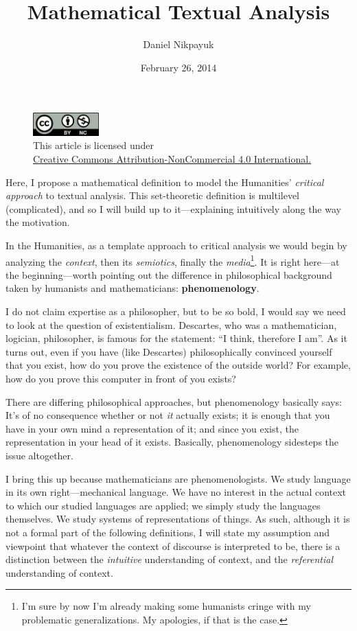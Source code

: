 \documentclass[twoside]{article}
\title{Mathematical Textual Analysis}
\author{Daniel Nikpayuk}
\date{February 26, 2014}
\begin{document}
\maketitle

\begin{figure}[h]
\centering
\includegraphics[width=1in]{cc-by-nc.png}\\[0.1in]
\tiny This article is licensed under \\
\href{http://creativecommons.org/licenses/by-nc/4.0/}
{Creative Commons Attribution-NonCommercial 4.0 International.}\\[0.3in]
\end{figure}

Here, I propose a mathematical definition to model the Humanities' \emph{critical approach} to textual analysis.
This set-theoretic definition is multilevel (complicated), and so I will build up to it---explaining intuitively
along the way the motivation.

In the Humanities, as a template approach to critical analysis we would begin by analyzing the \emph{context},
then its \emph{semiotics}, finally the \emph{media}\footnote{I'm sure by now I'm already making some humanists
cringe with my problematic generalizations. My apologies, if that is the case.}. It is right here---at the beginning---worth
pointing out the difference in philosophical background taken by humanists and mathematicians: {\bfseries phenomenology}.

I do not claim expertise as a philosopher, but to be so bold, I would say we need to look at the question of existentialism.
Descartes, who was a mathematician, logician, philosopher, is famous for the statement: ``I think, therefore I am''. As it
turns out, even if you have (like Descartes) philosophically convinced yourself that you exist, how do you prove the existence
of the outside world? For example, how do you prove this computer in front of you exists?

There are differing philosophical approaches, but phenomenology basically says: It's of no consequence whether or not
\emph{it} actually exists; it is enough that you have in your own mind a representation of it; and since you exist,
the representation in your head of it exists. Basically, phenomenology sidesteps the issue altogether.

I bring this up because mathematicians are phenomenologists. We study language in its own right---mechanical language.
We have no interest in the actual context to which our studied languages are applied; we simply study the languages themselves.
We study systems of representations of things.  As such, although it is not a formal part of the following definitions,
I will state my assumption and viewpoint that whatever the context of discourse is interpreted to be, there is a distinction
between the \emph{intuitive} understanding of context, and the \emph{referential} understanding of context.
\end{document}
